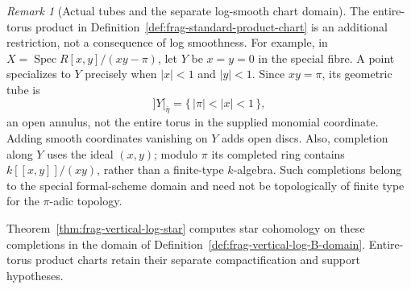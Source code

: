 \documentclass[11pt]{article}
\theoremstyle{definition}
\theoremstyle{remark}
\newtheorem{remark}[theorem]{Remark}
\begin{document}
\begin{remark}[Actual tubes and the separate log-smooth chart domain]
\label{rem:frag-actual-tube-domain}
The entire-torus product in Definition~\ref{def:frag-standard-product-chart}
is an additional restriction, not a consequence of log smoothness.
For example, in $X=\operatorname{Spec}R[x,y]/(xy-\pi)$, let $Y$ be
$x=y=0$ in the special fibre.  A point specializes to $Y$ precisely when
$|x|<1$ and $|y|<1$.  Since $xy=\pi$, its geometric tube is
\[
 ]Y[_{\bar\eta}=\{\,|\pi|<|x|<1\,\},
\]
an open annulus, not the entire torus in the supplied monomial coordinate.
Adding smooth coordinates vanishing on $Y$ adds open discs.  Also,
completion along $Y$ uses the ideal $(x,y)$; modulo $\pi$ its completed
ring contains $k[[x,y]]/(xy)$, rather than a finite-type $k$-algebra.
Such completions belong to the special formal-scheme domain and need
not be topologically of finite type for the $\pi$-adic topology.

Theorem~\ref{thm:frag-vertical-log-star} computes star cohomology on
these completions in the domain of
Definition~\ref{def:frag-vertical-log-B-domain}.  Entire-torus product
charts retain their separate compactification and support hypotheses.
\end{remark}
\end{document}
